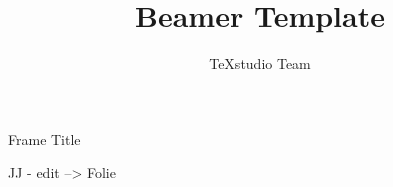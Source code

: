 


\title{Beamer Template}
\author{TeXstudio Team}


	
\begin{frame}[plain]
    \maketitle
\end{frame}


\begin{frame}{Frame Title}
	
	JJ - edit --> Folie 
	
\end{frame}


